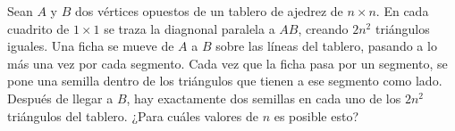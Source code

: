 Sean $A$ y $B$ dos vértices opuestos de un tablero de ajedrez de $n\times n$. En cada cuadrito de $1\times 1$ se traza la diagnonal paralela a $AB$, creando $2n^2$ triángulos iguales. Una ficha se mueve de $A$ a $B$ sobre las líneas del tablero, pasando a lo más una vez por cada segmento. Cada vez que la ficha pasa por un segmento, se pone una semilla dentro de los triángulos que tienen a ese segmento como lado. Después de llegar a $B$, hay exactamente dos semillas en cada uno de los $2n^2$ triángulos del tablero. ¿Para cuáles valores de $n$ es posible esto?